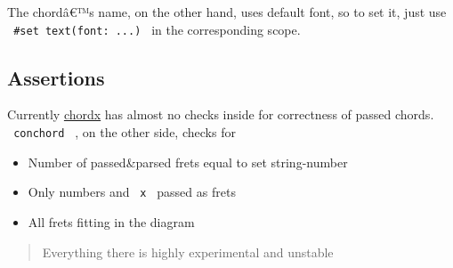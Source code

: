The chordâ€™s name, on the other hand, uses default font, so to set it,
just use \texttt{\ \#set\ text(font:\ ...)\ } in the corresponding
scope.

\subsection{Assertions}\label{assertions}

Currently \href{https://github.com/ljgago/typst-chords}{chordx} has
almost no checks inside for correctness of passed chords.
\texttt{\ conchord\ } , on the other side, checks for

\begin{itemize}
\tightlist
\item
  Number of passed\&parsed frets equal to set string-number
\item
  Only numbers and \texttt{\ x\ } passed as frets
\item
  All frets fitting in the diagram
\end{itemize}

\begin{quote}
Everything there is highly experimental and unstable
\end{quote}


